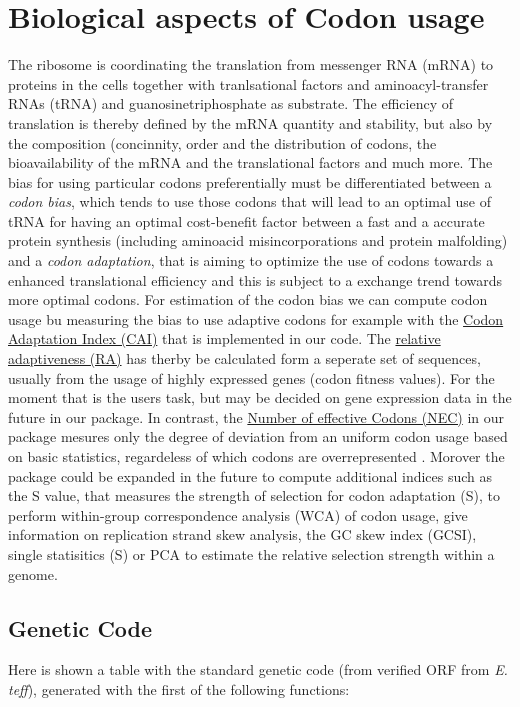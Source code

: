 \section{Biological aspects of Codon usage}
The ribosome is coordinating the translation from messenger RNA (mRNA) to proteins in the cells together with tranlsational factors and aminoacyl-transfer RNAs (tRNA) and guanosinetriphosphate as substrate. The efficiency of translation is thereby defined by the mRNA quantity and stability, but also by the composition (concinnity, order and the distribution of codons, the bioavailability of the mRNA and the translational factors and much more. The bias for using particular codons preferentially must be differentiated between a \textit{codon bias}, which tends to use those codons that will lead to an optimal use of tRNA for having an optimal cost-benefit factor between a fast and a accurate protein synthesis (including aminoacid misincorporations and protein malfolding) and a \textit{codon adaptation}, that is aiming to optimize the use of codons towards a enhanced translational efficiency and this is subject to a exchange trend towards more optimal codons.
For estimation of the codon bias we can compute codon usage bu measuring the bias to use adaptive codons for example with the \hyperlink{function:CAI}{Codon Adaptation Index (CAI)} that is implemented in our code. The \hyperlink{function:RA}{relative adaptiveness (RA)} has therby be calculated form a seperate set of sequences, usually from the usage of highly expressed genes (codon fitness values). For the moment that is the users task, but may be decided on gene expression data in the future in our package. In contrast, the 
\hyperlink{function:NEC}{Number of effective Codons (NEC)} in our package mesures only the degree of deviation from an uniform codon usage based on basic statistics, regardeless of which codons are overrepresented \cite{Suzuki2016}.
Morover the package could be expanded in the future to compute additional indices such as the S value, that measures the strength of selection for codon adaptation (S), to perform within-group correspondence analysis (WCA) of codon usage, give information on replication strand skew analysis, the GC skew index (GCSI), single statisitics (S) or PCA to estimate the relative selection strength within a genome.

\subsection{Genetic Code}
Here is shown a table with the standard genetic code (from verified ORF from \textit{E. teff}), generated with the first of the following functions:  
  
  

